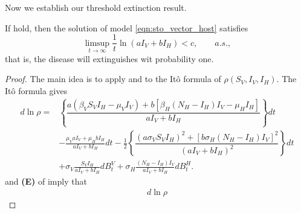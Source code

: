 %
%
%
Now we establish our threshold extinction result.
\begin{theorem}
    If  hold, then the solution of model 
    \eqref{eqn:sto_vector_host} satisfies
    \begin{equation}
        \limsup_{t \to \infty}
            \frac{1}{t}
            \ln(aI_V + b I_H) < c , \qquad a.s.,
    \end{equation}
    that is, the disease will extinguishes wit probability one.
\end{theorem}
%
%
\begin{proof}
    The main idea is to apply  and 
     to the It\^{o} formula of $\rho(S_V, I_V, I_H)$.
        The It\^{o} formula gives
    \begin{equation} \label{eqn:ito_extinction} 
        \begin{aligned}
          d \ln \rho =&
            \left \{
                \dfrac{
                    a (\beta_V S_V I_H - \mu_V I_V)
                    +
                    b [\beta_H (N_H - I_H) I_V - \mu_H I_H]
                }{a I_V + bI_H}
            \right \} dt
            \\
            & 
            -
            \frac{\mu_V  a I_V + \mu_H b I_H}{a I_V + b I_H}
            dt
            -
            \frac{1}{2}
            \left \{
                \dfrac{
                    \left(
                        a \sigma_V S_V I_H
                    \right) ^ 2
                    +
                    \left[
                        b \sigma_H (N_H - I_H) I_V
                    \right] ^2
                }{
                    \left( 
                        a I_V + bI_H
                    \right) ^ 2
                }
            \right \} dt
            \\
            & +
            \sigma_V 
            \frac{S_V I_H}{a I_V + b I_H}
            d B_t ^ V
            +
            \sigma_H 
            \frac{(N_H - I_H) I_V}{a I_V + b I_H}
            d B_t ^ H .
        \end{aligned}
    \end{equation}
     and \textsc{\textbf{(E)}} of 
     imply that
    \begin{equation} 
        \label{eqn:ito_extinction_bound} 
        \begin{aligned}
          d \ln \rho 

\end{aligned}
\end{equation}
\end{proof}
